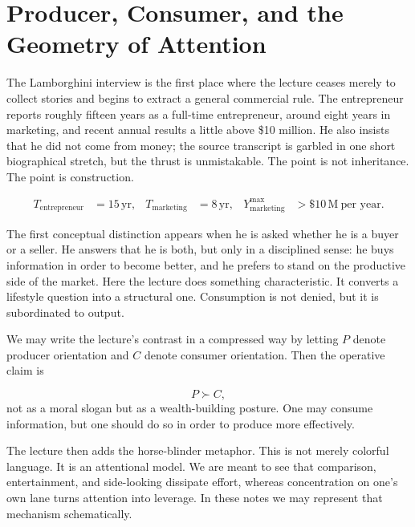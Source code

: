 \section{Producer, Consumer, and the Geometry of Attention}

The Lamborghini interview is the first place where the lecture ceases merely to collect stories and begins to extract a general commercial rule. The entrepreneur reports roughly fifteen years as a full-time entrepreneur, around eight years in marketing, and recent annual results a little above \$10 million. He also insists that he did not come from money; the source transcript is garbled in one short biographical stretch, but the thrust is unmistakable. The point is not inheritance. The point is construction.

\begin{align}
T_{\text{entrepreneur}} &= 15\,\text{yr}, &
T_{\text{marketing}} &= 8\,\text{yr}, &
Y^{\max}_{\text{marketing}} &> \$10\,\mathrm{M}\ \text{per year}.
\end{align}

The first conceptual distinction appears when he is asked whether he is a buyer or a seller. He answers that he is both, but only in a disciplined sense: he buys information in order to become better, and he prefers to stand on the productive side of the market. Here the lecture does something characteristic. It converts a lifestyle question into a structural one. Consumption is not denied, but it is subordinated to output.

We may write the lecture's contrast in a compressed way by letting \(P\) denote producer orientation and \(C\) denote consumer orientation. Then the operative claim is

\begin{equation}
P \succ C,
\end{equation}
not as a moral slogan but as a wealth-building posture. One may consume information, but one should do so in order to produce more effectively.

The lecture then adds the horse-blinder metaphor. This is not merely colorful language. It is an attentional model. We are meant to see that comparison, entertainment, and side-looking dissipate effort, whereas concentration on one's own lane turns attention into leverage. In these notes we may represent that mechanism schematically.

